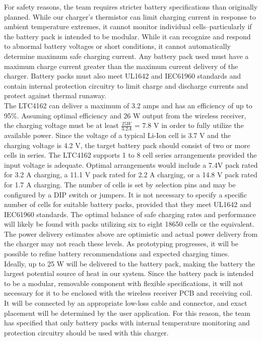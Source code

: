 \documentclass[12pt]{article}
\begin{document}
\pagebreak

\indent
For safety reasons, the team requires stricter battery specifications than originally planned. While our charger’s thermistor can limit charging current in response to ambient temperature extremes, it cannot monitor individual cells--particularly if the battery pack is intended to be modular. While it can recognize and respond to abnormal battery voltages or short conditions, it cannot automatically determine maximum safe charging current. Any battery pack used must have a maximum charge current greater than the maximum current delivery of the charger. Battery packs must also meet UL1642 and IEC61960 standards and contain internal protection circuitry to limit charge and discharge currents and protect against thermal runaway.\\

\indent
The LTC4162 can deliver a maximum of 3.2 amps and has an efficiency of up to 95\%. Assuming optimal efficiency and 26 W output from the wireless receiver, the charging voltage must be at least $\frac{25 W}{3.2 A}$ = 7.8 V in order to fully utilize the available power. Since the voltage of a typical Li-Ion cell is 3.7 V and the charging voltage is 4.2 V, the target battery pack should consist of two or more cells in series. The LTC4162 supports 1 to 8 cell series arrangements provided the input voltage is adequate. Optimal arrangements would include a 7.4V pack rated for 3.2 A charging, a 11.1 V pack rated for 2.2 A charging, or a 14.8 V pack rated for 1.7 A charging. The number of cells is set by selection pins and may be configured by a DIP switch or jumpers. It is not necessary to specify a specific number of cells for suitable battery packs, provided that they meet UL1642 and IEC61960 standards. The optimal balance of safe charging rates and performance will likely be found with packs utilizing six to eight 18650 cells or the equivalent. The power delivery estimates above are optimistic and actual power delivery from the charger may not reach these levels. As prototyping progresses, it will be possible to refine battery recommendations and expected charging times.\\

\indent
Ideally, up to 25 W will be delivered to the battery pack, making the battery the largest potential source of heat in our system. Since the battery pack is intended to be a modular, removable component with flexible specifications, it will not necessary for it to be enclosed with the wireless receiver PCB and receiving coil. It will be connected by an appropriate low-loss cable and connector, and exact placement will be determined by the user application. For this reason, the team has specified that only battery packs with internal temperature monitoring and protection circuitry should be used with this charger.\\
\end{document}
